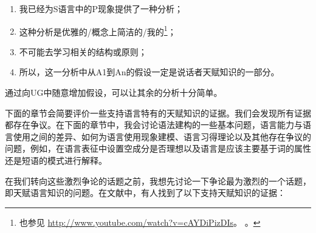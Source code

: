 \begin{enumerate}
\item 我已经为S语言中的P现象提供了一种分析；
\item 这种分析是优雅的/概念上简洁的/我的\footnote{%
    也参见
    \url{http://www.youtube.com/watch?v=cAYDiPizDIs}。 。\nocite{Zappa86a}
}；
\item 不可能去学习相关的结构或原则；
\item 所以，这一分析中从A1到An的假设一定是说话者天赋知识的一部分。
\end{enumerate}
通过向UG中随意增加假设，可以让其余的分析十分简单。

下面的章节会简要评价一些支持语言特有的天赋知识的证据。我们会发现所有证据都存在争议。在下面的章节中，我会讨论语法建构的一些基本问题，语言能力与语言使用之间的差异、如何为语言使用现象建模、语言习得理论以及其他存在争议的问题，例如，在语言表征中设置空成分是否理想以及语言是应该主要基于词的属性还是短语的模式进行解释。

在我们转向这些激烈争论的话题之前，我想先讨论一下争论最为激烈的一个话题，即天赋语言知识的问题。在文献中，有人找到了以下支持天赋知识的证据：

